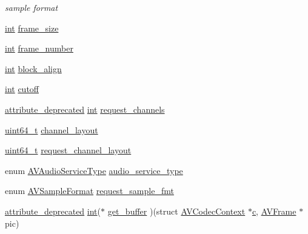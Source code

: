 \begin{DoxyCompactItemize}
\begin{DoxyCompactList}\small\item\em sample format \end{DoxyCompactList}\item 
\hyperlink{xmltok_8h_a5a0d4a5641ce434f1d23533f2b2e6653}{int} \hyperlink{struct_a_v_codec_context_aec57f0d859a6df8b479cd93ca3a44a33}{frame\+\_\+size}
\item 
\hyperlink{xmltok_8h_a5a0d4a5641ce434f1d23533f2b2e6653}{int} \hyperlink{struct_a_v_codec_context_a9e5a25a530d01c04491216c368a1a04a}{frame\+\_\+number}
\item 
\hyperlink{xmltok_8h_a5a0d4a5641ce434f1d23533f2b2e6653}{int} \hyperlink{struct_a_v_codec_context_ae56433cc80666ff63af59db4de5b5e45}{block\+\_\+align}
\item 
\hyperlink{xmltok_8h_a5a0d4a5641ce434f1d23533f2b2e6653}{int} \hyperlink{struct_a_v_codec_context_ae2cc92cf09edd8fdf95018bf5e08b910}{cutoff}
\item 
\hyperlink{attributes_8h_aa6d076561d3a9eea4729ee632652de02}{attribute\+\_\+deprecated} \hyperlink{xmltok_8h_a5a0d4a5641ce434f1d23533f2b2e6653}{int} \hyperlink{struct_a_v_codec_context_a5ad41beeb47aeedd84d1e81dc2ad40e2}{request\+\_\+channels}
\item 
\hyperlink{lib-src_2ffmpeg_2win32_2stdint_8h_aec6fcb673ff035718c238c8c9d544c47}{uint64\+\_\+t} \hyperlink{struct_a_v_codec_context_aeb08c575a79eb84fc4155dda88f46c06}{channel\+\_\+layout}
\item 
\hyperlink{lib-src_2ffmpeg_2win32_2stdint_8h_aec6fcb673ff035718c238c8c9d544c47}{uint64\+\_\+t} \hyperlink{struct_a_v_codec_context_a9c02c458deaa58cc603da038b6acab1b}{request\+\_\+channel\+\_\+layout}
\item 
enum \hyperlink{group__lavc__core_gadcff0a5957a99f6fdf1eec9d5a3fdfaf}{A\+V\+Audio\+Service\+Type} \hyperlink{struct_a_v_codec_context_a37e07891360937493c8ece702a09e0d6}{audio\+\_\+service\+\_\+type}
\item 
enum \hyperlink{samplefmt_8h_af9a51ca15301871723577c730b5865c5}{A\+V\+Sample\+Format} \hyperlink{struct_a_v_codec_context_a8f43cf7ebfe15119e93fa757572f4601}{request\+\_\+sample\+\_\+fmt}
\item 
\hyperlink{attributes_8h_aa6d076561d3a9eea4729ee632652de02}{attribute\+\_\+deprecated} \hyperlink{xmltok_8h_a5a0d4a5641ce434f1d23533f2b2e6653}{int}($\ast$ \hyperlink{struct_a_v_codec_context_abc3a806b73306162efa218510448d54f}{get\+\_\+buffer} )(struct \hyperlink{struct_a_v_codec_context}{A\+V\+Codec\+Context} $\ast$\hyperlink{rfft2d_test_m_l_8m_ae0323a9039add2978bf5b49550572c7c}{c}, \hyperlink{struct_a_v_frame}{A\+V\+Frame} $\ast$pic)

\end{DoxyCompactItemize}
